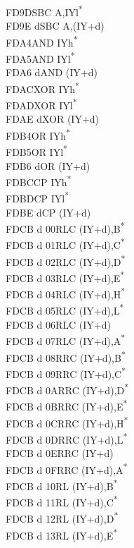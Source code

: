 \documentclass[twoside,openright,a4paper]{book}
\begin{document}
\begin{multicols}{3}
{\begin{tabbing}
	FD9D\>SBC A,IYl\textsuperscript{*}\\
	FD9E d\>SBC A,(IY+d)\\
	FDA4\>AND IYh\textsuperscript{*}\\
	FDA5\>AND IYl\textsuperscript{*}\\
	FDA6 d\>AND (IY+d)\\
	FDAC\>XOR IYh\textsuperscript{*}\\
	FDAD\>XOR IYl\textsuperscript{*}\\
	FDAE d\>XOR (IY+d)\\
	FDB4\>OR IYh\textsuperscript{*}\\
	FDB5\>OR IYl\textsuperscript{*}\\
	FDB6 d\>OR (IY+d)\\
	FDBC\>CP IYh\textsuperscript{*}\\
	FDBD\>CP IYl\textsuperscript{*}\\
	FDBE d\>CP (IY+d)\\
	FDCB d 00\>RLC (IY+d),B\textsuperscript{*}\\
	FDCB d 01\>RLC (IY+d),C\textsuperscript{*}\\
	FDCB d 02\>RLC (IY+d),D\textsuperscript{*}\\
	FDCB d 03\>RLC (IY+d),E\textsuperscript{*}\\
	FDCB d 04\>RLC (IY+d),H\textsuperscript{*}\\
	FDCB d 05\>RLC (IY+d),L\textsuperscript{*}\\
	FDCB d 06\>RLC (IY+d)\\
	FDCB d 07\>RLC (IY+d),A\textsuperscript{*}\\
	FDCB d 08\>RRC (IY+d),B\textsuperscript{*}\\
	FDCB d 09\>RRC (IY+d),C\textsuperscript{*}\\
	FDCB d 0A\>RRC (IY+d),D\textsuperscript{*}\\
	FDCB d 0B\>RRC (IY+d),E\textsuperscript{*}\\
	FDCB d 0C\>RRC (IY+d),H\textsuperscript{*}\\
	FDCB d 0D\>RRC (IY+d),L\textsuperscript{*}\\
	FDCB d 0E\>RRC (IY+d)\\
	FDCB d 0F\>RRC (IY+d),A\textsuperscript{*}\\
	FDCB d 10\>RL (IY+d),B\textsuperscript{*}\\
	FDCB d 11\>RL (IY+d),C\textsuperscript{*}\\
	FDCB d 12\>RL (IY+d),D\textsuperscript{*}\\
	FDCB d 13\>RL (IY+d),E\textsuperscript{*}\\

\end{tabbing}}
\end{multicols}
\end{document}
